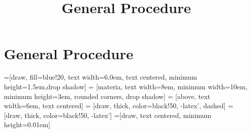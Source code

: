 \documentclass{article}
\begin{document}
\title{General Procedure}

\section{General Procedure}

	=[draw, fill=blue!20, text width=6.0em, text centered, minimum height=1.5em,drop shadow]
	 = [materia, text width=8em, minimum width=10em, minimum height=3em, rounded corners, drop shadow]
	 = [above, text width=6em, text centered]
	 = [draw, thick, color=black!50, -latex', dashed]
	 = [draw, thick, color=black!50, -latex']
	=[draw, text centered, minimum height=0.01em]
	
	\newcommand{\blockdist}{1.3}
	\newcommand{\edgedist}{1.5}
	
	\newcommand{\etape}[2]{node (p#1) [etape]
		{#2}}
	
	\newcommand{\background}[5]{%
		\begin{pgfonlayer}{background}
			\path (#1.west |- #2.north)+(-0.5,0.25) node (a1) {};
			\path (#3.east |- #4.south)+(+0.5,-0.25) node (a2) {};
			\path[fill=yellow!20,rounded corners, draw=black!50, dashed]
			(a1) rectangle (a2);
			\path (#3.east |- #2.north)+(0,0.25)--(#1.west |- #2.north) node[midway] (#5-n) {};
			\path (#3.east |- #2.south)+(0,-0.35)--(#1.west |- #2.south) node[midway] (#5-s) {};
			\path (#3.east |- #2.north)+(0.7,0)--(#3.east |- #4.south) node[midway] (#5-w) {};
	\end{pgfonlayer}}
	
	\newcommand{\transreceptor}[3]{%
		\path [linepart] (#1.east) -- node [above]
		{\scriptsize #2} (#3);}
\end{document}
